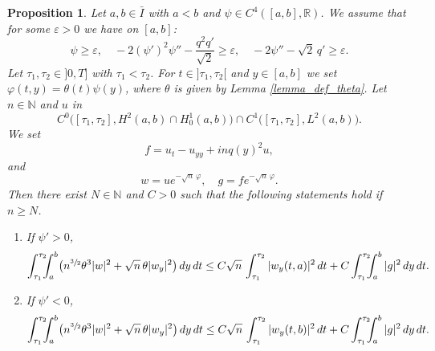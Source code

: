 \documentclass[10pt]{amsart}
\theoremstyle{plain}
\newtheorem{proposition}[theorem]{Proposition}
\theoremstyle{definition}
\newcommand{\abs}[1]{\vert #1\vert}
\newcommand{\1}{\mathds 1}
\newcommand{\R}{\mathbb{R}}
\newcommand{\N}{\mathbb{N}}
\let\e\varepsilon
\let\th\theta
\let\f\varphi
\begin{document}
\begin{proposition} \label{prop-carlemen-theta-psi}
Let $a,b \in \bar I$ with $a < b$ and $\psi \in C^4([a,b],\R)$. We assume that for some $\e > 0$ we have on $[a,b]$:
\[
\psi \geq \e, \quad - 2 (\psi')^2 \psi'' - \frac {q^2 q'}{\sqrt 2} \geq \e , \quad - 2 \psi'' - \sqrt 2\, q' \geq \e.
\]
Let $\tau_1,\tau_2 \in{}]0,T]$ with $\tau_1<\tau_2$. For $t \in{}]\tau_1,\tau_2[$ and $y \in [a,b]$ we set $\varphi(t,y) = \theta(t) \psi(y)$, where $\theta$ is given by Lemma \ref{lemma_def_theta}. Let $n \in \N$ and $u$ in
\begin{equation} \label{eq-C0-C1}
C^0\bigl([\tau_1,\tau_2],H^2(a,b) \cap H_0^1(a,b)\bigr) \cap C^1\bigl([\tau_1,\tau_2],L^2(a,b)\bigr).
\end{equation}
We set
\begin{equation} \label{eq-Kolmogorov-f}
f = u_t - u_{yy} + inq(y)^2 u,
\end{equation}
and
\begin{equation*}
w = u e^{-\sqrt n\,\f}, \quad g = f e^{-\sqrt n\,\f}.
\end{equation*}
Then there exist $N \in \N$ and $C>0$ such that the following statements hold if $n \geq N$.
\begin{enumerate}
\item If $\psi' > 0$,
\[
\int_{\tau_1}^{\tau_2}\hspace*{-2mm} \int_a^b \bigl(n^{\sfrac 32} \th^3 \abs w^2 + \sqrt n\,\th \abs{w_y}^2 \bigr) \, dy \, dt
\leq C \sqrt n\,\int_{\tau_1}^{\tau_2} \abs{w_y(t,a)}^2 \, dt + C \int_{\tau_1}^{\tau_2}\hspace*{-2mm} \int_a^b \abs g^2 \, dy \, dt.
\]
\item If $\psi' < 0$,
\[
\int_{\tau_1}^{\tau_2}\hspace*{-2mm} \int_a^b \bigl(n^{\sfrac 32} \th^3 \abs w^2 + \sqrt n\,\th \abs{w_y}^2 \bigr) \, dy \, dt
\leq C \sqrt n\,\int_{\tau_1}^{\tau_2} \abs{w_y(t,b)}^2 \, dt + C \int_{\tau_1}^{\tau_2}\hspace*{-2mm} \int_a^b \abs g^2 \, dy \, dt.
\]
\end{enumerate}
\end{proposition}
\end{document}
